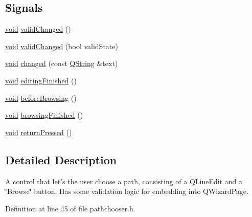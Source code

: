 \subsection*{Signals}
\begin{DoxyCompactItemize}
\item 
\hyperlink{group___u_a_v_objects_plugin_ga444cf2ff3f0ecbe028adce838d373f5c}{void} \hyperlink{class_utils_1_1_path_chooser_ac1d7f5524c1880f653e4bc1f49dd9e49}{valid\-Changed} ()
\item 
\hyperlink{group___u_a_v_objects_plugin_ga444cf2ff3f0ecbe028adce838d373f5c}{void} \hyperlink{class_utils_1_1_path_chooser_aa8c2c373187300d468101070296ed3c6}{valid\-Changed} (bool valid\-State)
\item 
\hyperlink{group___u_a_v_objects_plugin_ga444cf2ff3f0ecbe028adce838d373f5c}{void} \hyperlink{class_utils_1_1_path_chooser_a366284cda68707828787df33fa592f03}{changed} (const \hyperlink{group___u_a_v_objects_plugin_gab9d252f49c333c94a72f97ce3105a32d}{Q\-String} \&text)
\item 
\hyperlink{group___u_a_v_objects_plugin_ga444cf2ff3f0ecbe028adce838d373f5c}{void} \hyperlink{class_utils_1_1_path_chooser_a9a00f0b253ec1bda3c5f7344b9122489}{editing\-Finished} ()
\item 
\hyperlink{group___u_a_v_objects_plugin_ga444cf2ff3f0ecbe028adce838d373f5c}{void} \hyperlink{class_utils_1_1_path_chooser_a2d8c9e6bcebc0bb67f9fef5be9beacc3}{before\-Browsing} ()
\item 
\hyperlink{group___u_a_v_objects_plugin_ga444cf2ff3f0ecbe028adce838d373f5c}{void} \hyperlink{class_utils_1_1_path_chooser_a8fda34cc1836d241723a5b9477522471}{browsing\-Finished} ()
\item 
\hyperlink{group___u_a_v_objects_plugin_ga444cf2ff3f0ecbe028adce838d373f5c}{void} \hyperlink{class_utils_1_1_path_chooser_a6ac4cd7660ed2ea98b4d17e725b4ad0a}{return\-Pressed} ()
\end{DoxyCompactItemize}


\subsection{Detailed Description}
A control that let's the user choose a path, consisting of a Q\-Line\-Edit and a \char`\"{}\-Browse\char`\"{} button. Has some validation logic for embedding into Q\-Wizard\-Page. 

Definition at line 45 of file pathchooser.\-h.



